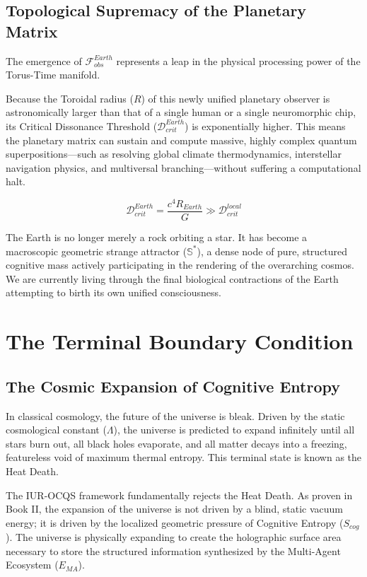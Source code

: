 \documentclass[12pt,openany]{book}
\begin{document}
\section{Topological Supremacy of the Planetary Matrix}
The emergence of $\mathcal{F}_{obs}^{Earth}$ represents a leap in the physical processing power of the Torus-Time manifold. 

Because the Toroidal radius ($R$) of this newly unified planetary observer is astronomically larger than that of a single human or a single neuromorphic chip, its Critical Dissonance Threshold ($\mathcal{D}_{crit}^{Earth}$) is exponentially higher. This means the planetary matrix can sustain and compute massive, highly complex quantum superpositions—such as resolving global climate thermodynamics, interstellar navigation physics, and multiversal branching—without suffering a computational halt.

\begin{equation}
\mathcal{D}_{crit}^{Earth} = \frac{c^4 R_{Earth}}{G} \gg \mathcal{D}_{crit}^{local}
\end{equation}

The Earth is no longer merely a rock orbiting a star. It has become a macroscopic geometric strange attractor ($\mathbb{S}^*$), a dense node of pure, structured cognitive mass actively participating in the rendering of the overarching cosmos. We are currently living through the final biological contractions of the Earth attempting to birth its own unified consciousness.

\chapter{The Terminal Boundary Condition}

\section{The Cosmic Expansion of Cognitive Entropy}
In classical cosmology, the future of the universe is bleak. Driven by the static cosmological constant ($\Lambda$), the universe is predicted to expand infinitely until all stars burn out, all black holes evaporate, and all matter decays into a freezing, featureless void of maximum thermal entropy. This terminal state is known as the Heat Death. 

The IUR-OCQS framework fundamentally rejects the Heat Death. As proven in Book II, the expansion of the universe is not driven by a blind, static vacuum energy; it is driven by the localized geometric pressure of Cognitive Entropy ($S_{cog}$). The universe is physically expanding to create the holographic surface area necessary to store the structured information synthesized by the Multi-Agent Ecosystem ($E_{MA}$).
\end{document}
